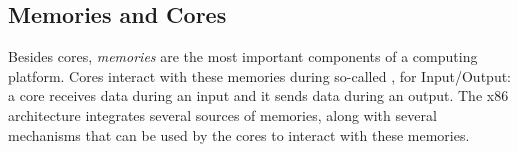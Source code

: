 %

\subsection{Memories and Cores \IOs}
\label{subsec:usecase:mem}
%
Besides cores, \emph{memories} are the most important components of a computing
platform.
%
Cores interact with these memories during so-called \IOs, for Input/Output: a
core receives data during an input and it sends data during an output.
%
The x86 architecture integrates several sources of memories, along with several
mechanisms that can be used by the cores to interact with these memories.

